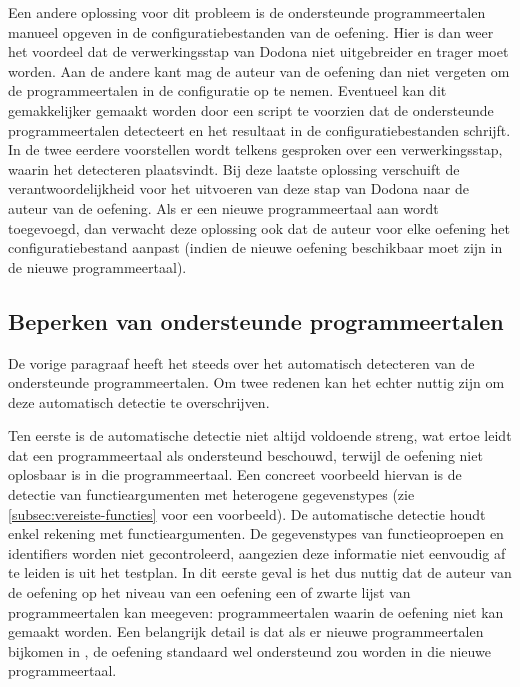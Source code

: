 Een andere oplossing voor dit probleem is de ondersteunde programmeertalen manueel opgeven in de configuratiebestanden van de oefening.
Hier is dan weer het voordeel dat de verwerkingsstap van Dodona niet uitgebreider en trager moet worden.
Aan de andere kant mag de auteur van de oefening dan niet vergeten om de programmeertalen in de configuratie op te nemen.
Eventueel kan dit gemakkelijker gemaakt worden door een script te voorzien dat de ondersteunde programmeertalen detecteert en het resultaat in de configuratiebestanden schrijft.
In de twee eerdere voorstellen wordt telkens gesproken over een verwerkingsstap, waarin het detecteren plaatsvindt.
Bij deze laatste oplossing verschuift de verantwoordelijkheid voor het uitvoeren van deze stap van Dodona naar de auteur van de oefening.
Als er een nieuwe programmeertaal aan \tested{} wordt toegevoegd, dan verwacht deze oplossing ook dat de auteur voor elke oefening het configuratiebestand aanpast (indien de nieuwe oefening beschikbaar moet zijn in de nieuwe programmeertaal).

\subsection{Beperken van ondersteunde programmeertalen}\label{subsec:beperken-beschikbare-programmeertalen}

De vorige paragraaf heeft het steeds over het automatisch detecteren van de ondersteunde programmeertalen.
Om twee redenen kan het echter nuttig zijn om deze automatisch detectie te overschrijven.

Ten eerste is de automatische detectie niet altijd voldoende streng, wat ertoe leidt dat \tested{} een programmeertaal als ondersteund beschouwd, terwijl de oefening niet oplosbaar is in die programmeertaal.
Een concreet voorbeeld hiervan is de detectie van functieargumenten met heterogene gegevenstypes (zie \cref{subsec:vereiste-functies} voor een voorbeeld).
De automatische detectie houdt enkel rekening met  functieargumenten.
De gegevenstypes van functieoproepen en identifiers worden niet gecontroleerd, aangezien deze informatie niet eenvoudig af te leiden is uit het testplan.
In dit eerste geval is het dus nuttig dat de auteur van de oefening op het niveau van een oefening een  of zwarte lijst van programmeertalen kan meegeven: programmeertalen waarin de oefening niet kan gemaakt worden.
Een belangrijk detail is dat als er nieuwe programmeertalen bijkomen in \tested{}, de oefening standaard wel ondersteund zou worden in die nieuwe programmeertaal.

